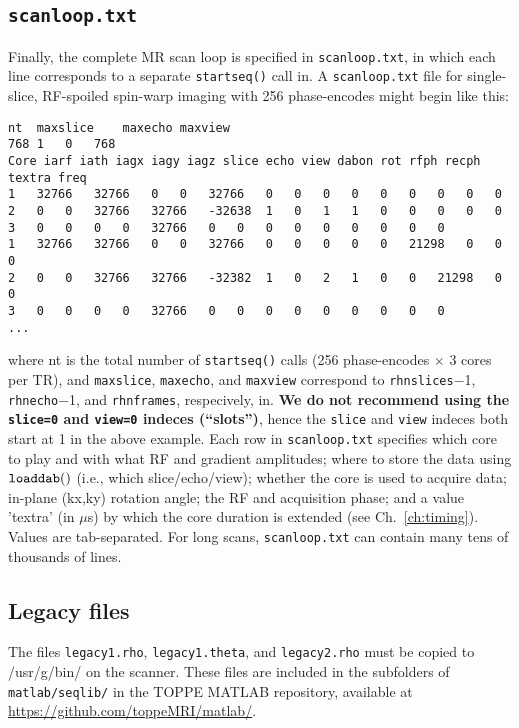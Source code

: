 \subsection{\tt scanloop.txt}
Finally, the complete MR scan loop is specified in {\tt scanloop.txt}, in which each line corresponds to a separate {\tt startseq()} call in\toppe.
A {\tt scanloop.txt} file for single-slice, RF-spoiled spin-warp imaging with 256 phase-encodes might begin like this:
\begin{lstlisting}
nt	maxslice	maxecho	maxview
768	1	0	768	
Core iarf iath iagx iagy iagz slice echo view dabon rot rfph recph textra freq
1	32766	32766	0	0	32766	0	0	0	0	0	0	0	0	0
2	0	0	32766	32766	-32638	1	0	1	1	0	0	0	0	0
3	0	0	0	0	32766	0	0	0	0	0	0	0	0	0
1	32766	32766	0	0	32766	0	0	0	0	0	21298	0	0	0
2	0	0	32766	32766	-32382	1	0	2	1	0	0	21298	0	0
3	0	0	0	0	32766	0	0	0	0	0	0	0	0	0
...
\end{lstlisting}
where nt is the total number of {\tt startseq()} calls (256 phase-encodes $\times$ 3 cores per TR), and \texttt{maxslice}, \texttt{maxecho}, and \texttt{maxview} correspond to \texttt{rhnslices}$-$1, \texttt{rhnecho}$-$1, and \texttt{rhnframes}, respecively, in\toppe.
\textbf{We do not recommend using the {\tt slice=0} and {\tt view=0} indeces (``slots'')}, hence the {\tt slice} and {\tt view} indeces both start at 1 in the above example.
Each row in {\tt scanloop.txt} specifies which core to play and with what RF and gradient amplitudes; where to store the data using $\tt loaddab()$ (i.e., which slice/echo/view); whether the core is used to acquire data; in-plane (kx,ky) rotation angle; the RF and acquisition phase; and a value 'textra' (in $\mu$s) by which the core duration is extended (see Ch.~\ref{ch:timing}).
Values are tab-separated.
For long scans, {\tt scanloop.txt} can contain many tens of thousands of lines.


\subsection{Legacy files }

The files {\tt legacy1.rho}, {\tt legacy1.theta}, and {\tt legacy2.rho} must be copied to /usr/g/bin/ on the scanner.
These files are included in the subfolders of {\tt matlab/seqlib/} in the TOPPE MATLAB repository, available at \url{https://github.com/toppeMRI/matlab/}.

